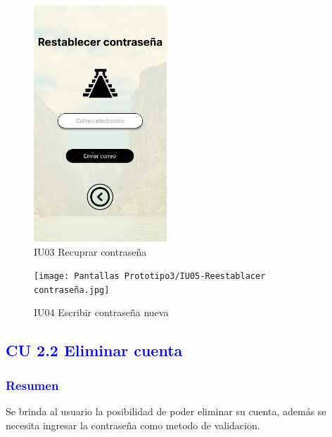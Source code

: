     \begin{figure}[htb]
        \centering
        \includegraphics[width= 5cm]{Pantallas Prototipo3/IU03 Pantalla correo restablecimiento.jpg}
        \caption{IU03 Recuprar contraseña}
        \label{fig:enter-label}
    \end{figure}
    \begin{figure}[htb]
        \centering
        \texttt{[image: Pantallas Prototipo3/IU05-Reestablacer contraseña.jpg]}
        \caption{IU04 Escribir contraseña nueva}
        \label{fig:enter-label}
    \end{figure}



















\subsection{\textcolor{blue}{CU 2.2 Eliminar cuenta}}

\subsubsection{\textcolor{blue}{Resumen}}
Se brinda al usuario la posibilidad de poder eliminar su cuenta, además se necesita ingresar la contraseña como metodo de validacion.
